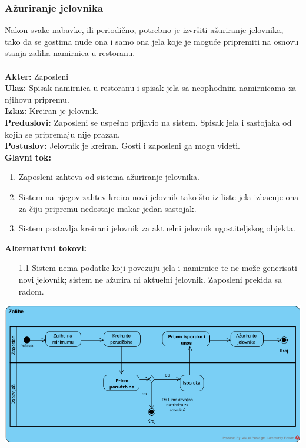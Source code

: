 \documentclass{article}
\begin{document}
\subsubsection{Ažuriranje jelovnika}
Nakon svake nabavke, ili periodično, potrebno je izvršiti ažuriranje jelovnika, tako da se gostima nude ona i samo ona jela koje je moguće pripremiti na osnovu stanja zaliha namirnica u restoranu.\\\\
\textbf{Akter:} Zaposleni\\
\textbf{Ulaz:} Spisak namirnica u restoranu i spisak jela sa neophodnim namirnicama za njihovu pripremu.\\
\textbf{Izlaz:} Kreiran je jelovnik.\\
\textbf{Preduslovi:} Zaposleni se uspešno prijavio na sistem. Spisak jela i sastojaka od kojih se pripremaju nije prazan.\\
\textbf{Postuslov:} Jelovnik je kreiran. Gosti i zaposleni ga mogu videti.\\
\textbf{Glavni tok:} 
\begin{enumerate}
	\item Zaposleni zahteva od sistema ažuriranje jelovnika.
	\item Sistem na njegov zahtev kreira novi jelovnik tako što iz liste jela izbacuje ona za čiju pripremu nedostaje makar jedan sastojak.
	\item Sistem postavlja kreirani jelovnik za aktuelni jelovnik ugostiteljskog objekta.
\end{enumerate}
\textbf{Alternativni tokovi:}
\begin{itemize}
\item [1.1] Sistem nema podatke koji povezuju jela i namirnice te ne može generisati novi jelovnik; sistem ne ažurira ni aktuelni jelovnik. Zaposleni prekida sa radom.
\end{itemize}

\includegraphics[width=\textwidth]{SU_1_zalihe_activity.png}
\end{document}
